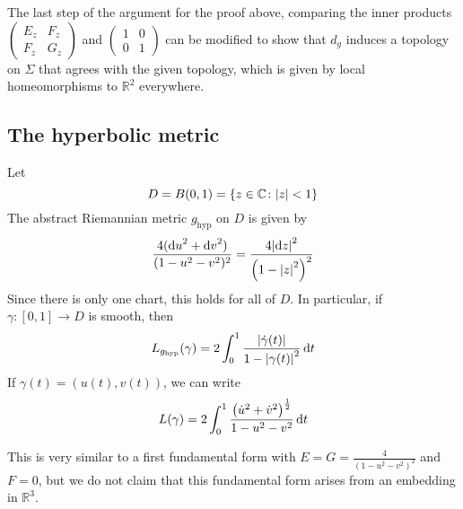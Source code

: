\begin{remark}
	The last step of the argument for the proof above, comparing the inner products \( \begin{pmatrix}
		E_z & F_z \\
		F_z & G_z
	\end{pmatrix} \) and \( \begin{pmatrix}
		1 & 0 \\
		0 & 1
	\end{pmatrix} \) can be modified to show that \( d_g \) induces a topology on \( \Sigma \) that agrees with the given topology, which is given by local homeomorphisms to \( \mathbb R^2 \) everywhere.
\end{remark}

\subsection{The hyperbolic metric}
\begin{definition}
	Let
	\[
		D = B(0,1) = \qty{z \in \mathbb C \colon \abs{z} < 1}
	\]
	The abstract Riemannian metric \( g_{\mathrm{hyp}} \) on \( D \) is given by
	\[
		\frac{4(\dd{u}^2 + \dd{v}^2)}{(1-u^2-v^2)^2} = \frac{4 \abs{\dd{z}}^2}{\qty(1 - \abs{z}^2)^2}
	\]
	Since there is only one chart, this holds for all of \( D \).
	In particular, if \( \gamma \colon [0,1] \to D \) is smooth, then
	\[
		L_{g_{\mathrm{hyp}}}(\gamma) = 2 \int_0^1 \frac{\abs{\dot\gamma(t)}}{1 - \abs{\gamma(t)}^2} \dd{t}
	\]
	If \( \gamma(t) = (u(t), v(t)) \), we can write
	\[
		L(\gamma) = 2 \int_0^1 \frac{\qty(\dot u^2 + \dot v^2)^{\frac{1}{2}}}{1 - u^2 - v^2} \dd{t}
	\]
\end{definition}
This is very similar to a first fundamental form with \( E = G = \frac{4}{(1-u^2-v^2)^2} \) and \( F = 0 \), but we do not claim that this fundamental form arises from an embedding in \( \mathbb R^3 \).

